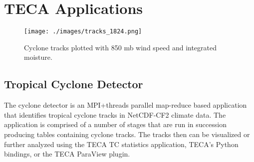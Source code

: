 \documentclass[a4paper,10pt,DIV=12]{scrreprt}
\begin{document}
%
%
%
\chapter{TECA Applications}
\begin{figure}[t]
 \centering
 \texttt{[image: ./images/tracks\_1824.png]}
 \caption{Cyclone tracks plotted with 850 mb wind speed and integrated moisture.}
 \label{fig:candidates_and_tracks}
\end{figure}

\section{Tropical Cyclone Detector}
The cyclone detector is an MPI+threads parallel map-reduce based application that identifies tropical cyclone tracks in NetCDF-CF2 climate data. The application is comprised of a number of stages that are run in succession producing tables containing cyclone tracks. The tracks then can be visualized or further analyzed using the TECA TC statistics application, TECA's Python bindings, or the TECA ParaView plugin.
\end{document}
